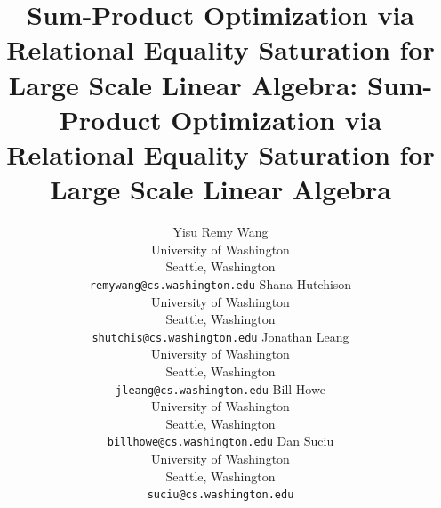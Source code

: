 \documentclass{article}
\title{Sum-Product Optimization via
  Relational Equality Saturation for Large Scale Linear Algebra}
\begin{document}

\title{\sys: Sum-Product Optimization via
  Relational Equality Saturation for Large Scale Linear Algebra}



%
%
%
%

\author{
Yisu Remy Wang\\
      University of Washington\\
      Seattle, Washington\\
      \texttt{remywang@cs.washington.edu}
\And
Shana Hutchison\\
      University of Washington\\
      Seattle, Washington\\
      \texttt{shutchis@cs.washington.edu}
\And Jonathan Leang\\
      University of Washington\\
      Seattle, Washington\\
      \texttt{jleang@cs.washington.edu}
\And  %
 Bill Howe\\
      University of Washington\\
      Seattle, Washington\\
      \texttt{billhowe@cs.washington.edu}
\And Dan Suciu\\
      University of Washington\\
      Seattle, Washington\\
      \texttt{suciu@cs.washington.edu}
}
\end{document}
